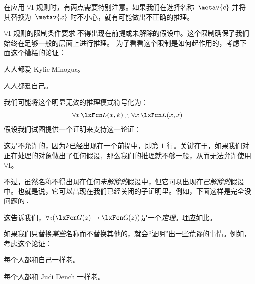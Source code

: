 在应用 $\forall$I 规则时，有两点需要特别注意。如果我们在选择名称~$\metav{c}$ 并将其替换为~$\metav{x}$ 时不小心，就有可能做出不正确的推理。

$\forall$I 规则的限制条件要求  不得出现在前提或未解除的假设中。这个限制确保了我们始终在足够一般的层面上进行推理。%
为了看看这个限制是如何起作用的，考虑下面这个糟糕的论证：

\begin{earg}
		\item 人人都爱 Kylie Minogue。
		\item[\texttherefore] 人人都爱自己。
	\end{earg}

我们可能将这个明显无效的推理模式符号化为：
$$\forall x\,\atom{L}{x,k} \therefore \forall x\,\atom{L}{x,x}$$
假设我们试图提供一个证明来支持这一论证：

\begin{fitchproof}
	\PR
	 
	 
\end{fitchproof}

这是不允许的，因为$k$已经出现在一个前提中，即第 $1$ 行。关键在于，如果我们对正在处理的对象做出了任何假设，那么我们的推理就不够一般，从而无法允许使用 $\forall$I。

不过，虽然名称不得出现在任何\emph{未解除的}假设中，但它可以出现在\emph{已解除的}假设中。也就是说，它可以出现在我们已经关闭的子证明里。例如，下面这样是完全没问题的：

\begin{fitchproof}
	\open
		\AS
	\close
\end{fitchproof}

这告诉我们，$\forall z (\atom{G}{z} \eif \atom{G}{z})$是一个\emph{定理}。理应如此。

如果我们只替换\emph{某些}名称而不替换其他的，就会“证明”出一些荒谬的事情。例如，考虑这个论证：

\begin{earg}
	\item 每个人都和自己一样老。
	\item[\texttherefore] 每个人都和 Judi Dench 一样老。
	\end{earg}

